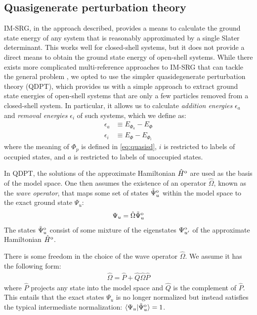 \subsection{Quasigenerate perturbation theory}
\label{subsec:selfenergy}

IM-SRG, in the approach described, provides a means to calculate the ground state energy of any system that is reasonably approximated by a single Slater determinant.  This works well for closed-shell systems, but it does not provide a direct means to obtain the ground state energy of open-shell systems.  While there exists more complicated multi-reference approaches to IM-SRG that can tackle the general problem \cite{Hergert2016165}, we opted to use the simpler quasidegenerate perturbation theory (QDPT), which provides us with a simple approach to extract ground state energies of open-shell systems that are only a few particles removed from a closed-shell system.  In particular, it allows us to calculate \textit{addition energies} $\epsilon_a$ and \textit{removal energies} $\epsilon_i$ of such systems, which we define as:
\begin{align}
  \epsilon_a &\equiv E_{\Phi_a} - E_{\Phi} \\
  \epsilon_i &\equiv E_{\Phi} - E_{\Phi_i}
\end{align}
where the meaning of $\Phi_p$ is defined in \eqref{eq:quasisd}, $i$ is restricted to labels of occupied states, and $a$ is restricted to labels of unoccupied states.

In QDPT, the solutions of the approximate Hamiltonian $\hat H^{\text o}$ are used as the basis of the model space.  One then assumes the existence of an operator $\hat \Omega$, known as the \textit{wave operator}, that maps some set of states $\tilde \Psi^{\text o}_u$ within the model space to the exact ground state $\Psi_u$:
\begin{align} \label{eq:omega-condition1}
  \Psi_u = \hat \Omega \tilde \Psi^{\text o}_u
\end{align}
The states $\tilde \Psi^{\text o}_u$ consist of some mixture of the eigenstates
$\Psi^{\text o}_{u'}$ of the approximate Hamiltonian $\hat H^{\text o}$.

There is some freedom in the choice of the wave operator $\hat \Omega$.  We
assume it has the following form:
\begin{align} \label{eq:omega-condition2}
  \hat \Omega = \hat P + \hat Q \hat \Omega \hat P
\end{align}
where $\hat P$ projects any state into the model space and $\hat Q$ is the
complement of $\hat P$.  This entails that the exact states $\Psi_u$ is no
longer normalized but instead satisfies the typical intermediate
normalization: $\langle \Psi_u | \tilde \Psi^{\text o}_u \rangle = 1$.

